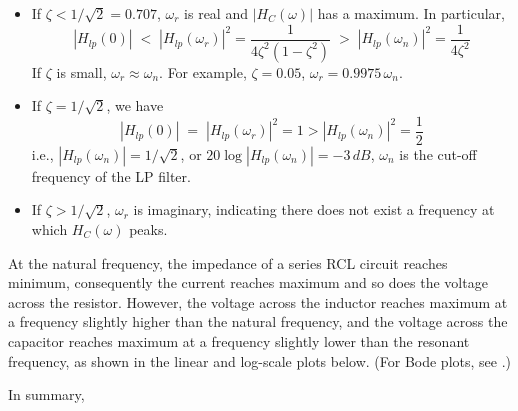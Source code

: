 \documentclass{article}
\begin{document}
\begin{itemize}
  \begin{itemize}
  \item If $\zeta<1/\sqrt{2}=0.707$, $\omega_r$ is real and $|H_C(\omega)|$
    has a maximum. In particular,
    \begin{equation}
      |H_{lp}(0)|\;<\;|H_{lp}(\omega_r)|^2=\frac{1}{4\zeta^2(1-\zeta^2)}
      \;>\; |H_{lp}(\omega_n)|^2=\frac{1}{4\zeta^2}
    \end{equation}
    If $\zeta$ is small, $\omega_r\approx\omega_n$. For example,
    $\zeta=0.05$, $\omega_r=0.9975\,\omega_n$. 

  \item If $\zeta=1/\sqrt{2}$, we have
    \begin{equation}
      |H_{lp}(0)|\;=\;|H_{lp}(\omega_r)|^2=1>|H_{lp}(\omega_n)|^2=\frac{1}{2}
    \end{equation}
    i.e., $|H_{lp}(\omega_n)|=1/\sqrt{2}$, or $20\log |H_{lp}(\omega_n)|=-3\,dB$,
    $\omega_n$ is the cut-off frequency of the LP filter.
  \item If $\zeta>1/\sqrt{2}$, $\omega_r$ is imaginary, indicating
    there does not exist a frequency at which $H_C(\omega)$ peaks. 
  \end{itemize}


\end{itemize}


At the natural frequency, the impedance of a series RCL circuit reaches
minimum, consequently the current reaches maximum and so does the voltage 
across the resistor. However, the voltage across the inductor reaches 
maximum at a frequency slightly higher than the natural frequency, and 
the voltage across the capacitor reaches maximum at a frequency slightly 
lower than the resonant frequency, as shown in the linear and log-scale 
plots below. (For Bode plots, see
.)


In summary,
\end{document}

